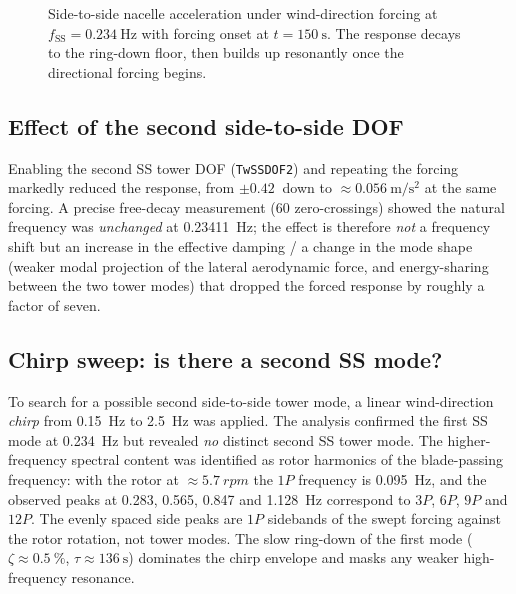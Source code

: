 \begin{figure}[t]
  \centering
  \caption{Side-to-side nacelle acceleration under wind-direction forcing at
  $f_{\mathrm{SS}}=\SI{0.234}{\hertz}$ with forcing onset at
  $t=\SI{150}{\second}$. The response decays to the ring-down floor, then builds
  up resonantly once the directional forcing begins.}
  \label{fig:ss-buildup}
\end{figure}

\subsection{Effect of the second side-to-side DOF}
\label{subsec:of-dof2}

Enabling the second SS tower DOF (\texttt{TwSSDOF2}) and repeating the forcing
markedly reduced the response, from $\pm\SI{0.42}{}$ down to
$\approx\SI{0.056}{\metre\per\second\squared}$ at the same forcing. A precise
free-decay measurement (60 zero-crossings) showed the natural frequency was
\emph{unchanged} at \SI{0.23411}{\hertz}; the effect is therefore \emph{not} a
frequency shift but an increase in the effective damping / a change in the mode
shape (weaker modal projection of the lateral aerodynamic force, and
energy-sharing between the two tower modes) that dropped the forced response by
roughly a factor of seven.

\subsection{Chirp sweep: is there a second SS mode?}
\label{subsec:of-chirp}

To search for a possible second side-to-side tower mode, a linear
wind-direction \emph{chirp} from \SI{0.15}{\hertz} to \SI{2.5}{\hertz} was
applied. The analysis confirmed the first SS mode at \SI{0.234}{\hertz} but
revealed \emph{no} distinct second SS tower mode. The higher-frequency spectral
content was identified as rotor harmonics of the blade-passing frequency: with
the rotor at $\approx\SI{5.7}{rpm}$ the $1P$ frequency is \SI{0.095}{\hertz},
and the observed peaks at \SI{0.283}{}, \SI{0.565}{}, \SI{0.847}{} and
\SI{1.128}{\hertz} correspond to $3P$, $6P$, $9P$ and $12P$. The evenly spaced
side peaks are $1P$ sidebands of the swept forcing against the rotor rotation,
not tower modes. The slow ring-down of the first mode
($\zeta\approx\SI{0.5}{\percent}$, $\tau\approx\SI{136}{\second}$) dominates the
chirp envelope and masks any weaker high-frequency resonance.


